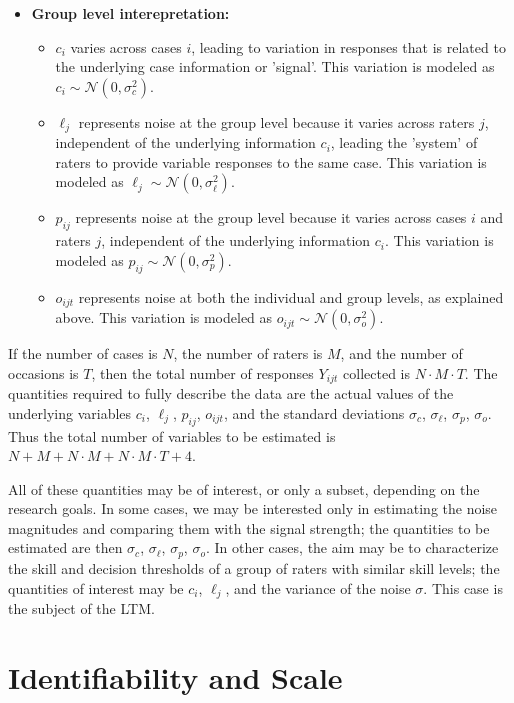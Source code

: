 \begin{itemize}
\begin{itemize}
    \end{itemize}
    \item \textbf{Group level interepretation:}
    \begin{itemize}
        \item $c_i$ varies across cases $i$, leading to variation in responses that is related to the underlying case information or 'signal'. This variation is modeled as $c_i \sim \mathcal{N}(0,\sigma_c^2)$.
        \item $\ell_j$ represents noise at the group level because it varies across raters $j$, independent of the underlying information $c_i$, leading the 'system' of raters to provide variable responses to the same case. This variation is modeled as $\ell_j \sim \mathcal{N}(0,\sigma_\ell^2)$.
        \item $p_{ij}$ represents noise at the group level because it varies across cases $i$ and raters $j$, independent of the underlying information $c_i$. This variation is modeled as $p_{ij} \sim \mathcal{N}(0,\sigma_p^2)$.
        \item $o_{ijt}$ represents noise at both the individual and group levels, as explained above. This variation is modeled as $o_{ijt} \sim \mathcal{N}(0,\sigma_o^2)$.
    \end{itemize}
\end{itemize}

If the number of cases is $N$, the number of raters is $M$, and the number of occasions is $T$, then the total number of responses $Y_{ijt}$ collected is $N \cdot M \cdot T$. The quantities required to fully describe the data are the actual values of the underlying variables $c_i$, $\ell_j$, $p_{ij}$, $o_{ijt}$, and the standard deviations $\sigma_c$, $\sigma_\ell$, $\sigma_p$, $\sigma_o$. Thus the total number of variables to be estimated is $N + M + N \cdot M + N \cdot M \cdot T + 4$.

All of these quantities may be of interest, or only a subset, depending on the research goals. In some cases, we may be interested only in estimating the noise magnitudes and comparing them with the signal strength; the quantities to be estimated are then $\sigma_c$, $\sigma_\ell$, $\sigma_p$, $\sigma_o$. In other cases, the aim may be to characterize the skill and decision thresholds of a group of raters with similar skill levels; the quantities of interest may be $c_i$, $\ell_j$, and the variance of the noise $\sigma$. This case is the subject of the LTM.

\section*{Identifiability and Scale}\label{section-identifiability}

